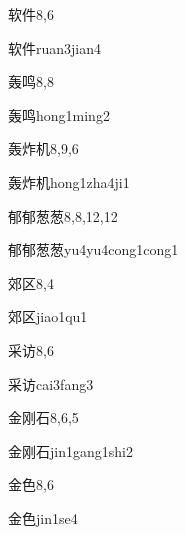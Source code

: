 \begin{entry}{软件}{8,6}
  \begin{phonetics}{软件}{ruan3jian4}
  \end{phonetics}
\end{entry}

\begin{entry}{轰鸣}{8,8}
  \begin{phonetics}{轰鸣}{hong1ming2}
  \end{phonetics}
\end{entry}

\begin{entry}{轰炸机}{8,9,6}
  \begin{phonetics}{轰炸机}{hong1zha4ji1}
  \end{phonetics}
\end{entry}

\begin{entry}{郁郁葱葱}{8,8,12,12}
  \begin{phonetics}{郁郁葱葱}{yu4yu4cong1cong1}
  \end{phonetics}
\end{entry}

\begin{entry}{郊区}{8,4}
  \begin{phonetics}{郊区}{jiao1qu1}
  \end{phonetics}
\end{entry}

\begin{entry}{采访}{8,6}
  \begin{phonetics}{采访}{cai3fang3}
  \end{phonetics}
\end{entry}

\begin{entry}{金刚石}{8,6,5}
  \begin{phonetics}{金刚石}{jin1gang1shi2}
  \end{phonetics}
\end{entry}

\begin{entry}{金色}{8,6}
  \begin{phonetics}{金色}{jin1se4}
  \end{phonetics}
\end{entry}

